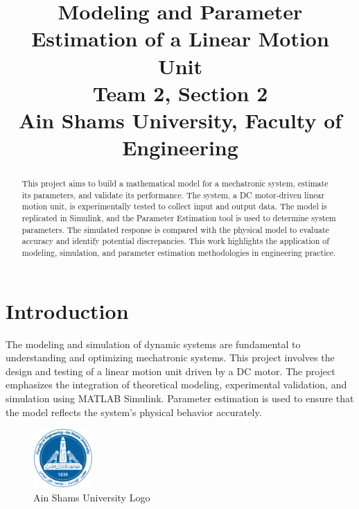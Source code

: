 \documentclass[conference]{IEEEtran}
\begin{document}
\title{Modeling and Parameter Estimation of a Linear Motion Unit\\
\bigskip
{\Large \textbf{Team 2, Section 2}} \\ %
\textbf{Ain Shams University, Faculty of Engineering} %
}

\author{}

\maketitle

\begin{abstract}
This project aims to build a mathematical model for a mechatronic system, estimate its parameters, and validate its performance. The system, a DC motor-driven linear motion unit, is experimentally tested to collect input and output data. The model is replicated in Simulink, and the Parameter Estimation tool is used to determine system parameters. The simulated response is compared with the physical model to evaluate accuracy and identify potential discrepancies. This work highlights the application of modeling, simulation, and parameter estimation methodologies in engineering practice.
\end{abstract}

\section{Introduction}
The modeling and simulation of dynamic systems are fundamental to understanding and optimizing mechatronic systems. This project involves the design and testing of a linear motion unit driven by a DC motor. The project emphasizes the integration of theoretical modeling, experimental validation, and simulation using MATLAB Simulink. Parameter estimation is used to ensure that the model reflects the system's physical behavior accurately.
\begin{figure}[H]
    \centering
    \includegraphics[width=0.2\textwidth]{asu.png}
    \caption{Ain Shams University Logo}
\label{fig:asu}
\end{figure}
\end{document}
